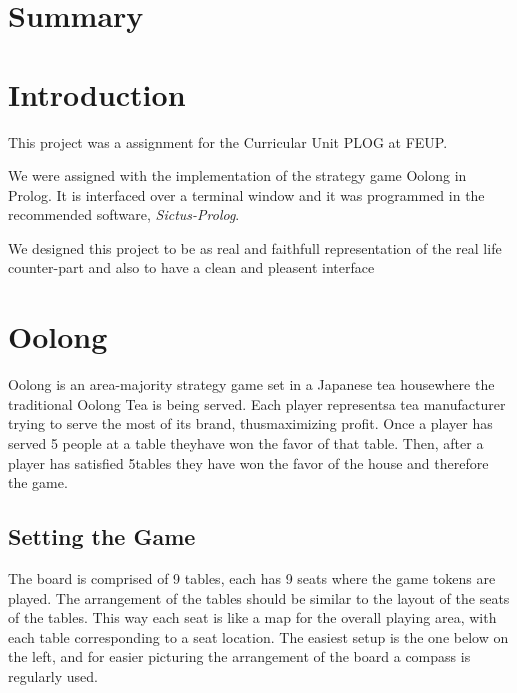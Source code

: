 \documentclass[a4paper]{article}
\begin{document}
\newpage

\section*{Summary}

\newpage

\tableofcontents



\newpage

\section{Introduction}

This project was a assignment for the Curricular Unit PLOG at FEUP. \par
We were assigned with the implementation of the strategy game Oolong in Prolog.
It is interfaced over a terminal window and it was programmed in the recommended software,
 \textit{Sictus-Prolog}.
 \par
We designed this project to be as real and faithfull representation of the real life counter-part and
also to have a clean and pleasent interface



\section{Oolong}
Oolong​ ​is​ ​an​ ​area-majority​ ​strategy​ ​game​ ​set​ ​in​ ​a​ ​Japanese​ ​tea​ ​house​ ​where​ ​the​ ​traditional
Oolong​ ​Tea​​ ​is​ ​being​ ​served.​ ​Each​ ​player​ ​represents​ ​a​ ​tea​ ​manufacturer​ ​trying​ ​to​ ​serve​ ​the​ ​most
of​ ​its​ ​brand,​ ​thus​ ​maximizing​ ​profit.​ ​Once​ ​a​ ​player​ ​has​ ​served​ ​5​ ​people​ ​at​ ​a​ ​table​ ​they​ ​have​ ​won
the​ ​favor​ ​of​ ​that​ ​table.​ ​Then,​ ​after​ ​a​ ​player​ ​has​ ​satisfied​ ​5​ ​tables​ ​they​ ​have​ ​won​ ​the​ ​favor​ ​of​ ​the
house​ ​and​ ​therefore​ ​the​ ​game.

\subsection{Setting​ ​the​ ​Game}
The board is comprised of 9 tables, each has 9 seats where the game tokens are played.
The arrangement of the tables should be similar to the layout of the seats of the tables. This way
each seat is like a map for the overall playing area, with each table corresponding to a seat
location. The easiest setup is the one below on the left, and for easier picturing the arrangement
of the board a compass is regularly used.
\end{document}
